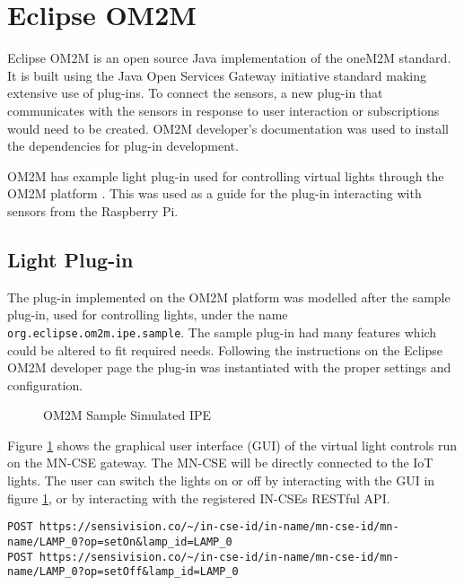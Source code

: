 \section{Eclipse OM2M}

Eclipse OM2M is an open source Java implementation of the oneM2M standard. It is built using the Java Open Services Gateway initiative standard making extensive use of plug-ins. To connect the sensors, a new plug-in that communicates with the sensors in response to user interaction or subscriptions would need to be created. OM2M developer’s documentation \cite{om2mdeveloper} was used to install the dependencies for plug-in development. 

OM2M has example light plug-in used for controlling virtual lights through the OM2M platform \cite{Eclipse2018OM2M/one/WebEclipsepedia}. This was used as a guide for the plug-in interacting with sensors from the Raspberry Pi.

\subsection{Light Plug-in}
\label{light plugin}

The plug-in implemented on the OM2M platform was modelled after the sample plug-in, used for controlling lights, under the name \lstinline{org.eclipse.om2m.ipe.sample}. The sample plug-in had many features which could be altered to fit required needs. Following the instructions on the Eclipse OM2M developer page \cite{om2mdeveloper} the plug-in was instantiated with the proper settings and configuration.

\begin{figure}[H]
  \centering
  \caption{OM2M Sample Simulated IPE}
  \label{fig:sample-simulated-ipe}
\end{figure}

Figure \ref{fig:sample-simulated-ipe} shows the graphical user interface (GUI) of the virtual light controls run on the MN-CSE gateway. The MN-CSE will be directly connected to the IoT lights. The user can switch the lights on or off by interacting with the GUI in figure \ref{fig:sample-simulated-ipe}, or by interacting with the registered IN-CSEs RESTful API.\\

\begin{lstlisting}[caption={Interacting with lights using REST}, label={lst:lights}]
POST https://sensivision.co/~/in-cse-id/in-name/mn-cse-id/mn-name/LAMP_0?op=setOn&lamp_id=LAMP_0
POST https://sensivision.co/~/in-cse-id/in-name/mn-cse-id/mn-name/LAMP_0?op=setOff&lamp_id=LAMP_0
\end{lstlisting}

